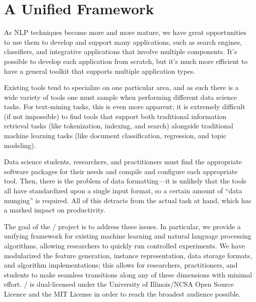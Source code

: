 \section{A Unified Framework}
\label{sec:framework}

As NLP techniques become more and more mature, we have great opportunities to
use them to develop and support many applications, such as search engines,
classifiers, and integrative applications that involve multiple components. It's
possible to develop each application from scratch, but it's much more efficient
to have a general toolkit that supports multiple application types.

Existing tools tend to specialize on one particular area, and as such there is a
wide variety of tools one must sample when performing different data science
tasks. For text-mining tasks, this is even more apparent; it is extremely
difficult (if not impossible) to find tools that support both traditional
information retrieval tasks (like tokenization, indexing, and search) alongside
traditional machine learning tasks (like document classification, regression,
and topic modeling).

Data science students, researchers, and practitioners must find the appropriate
software packages for their needs and compile and configure each appropriate
tool. Then, there is the problem of data formatting---it is unlikely that the
tools all have standardized upon a single input format, so a certain amount of
``data munging'' is required. All of this detracts from the actual task at hand,
which has a marked impact on productivity.

The goal of the \meta/ project is to address these issues. In particular, we
provide a unifying framework for existing machine learning and natural language
processing algorithms, allowing researchers to quickly run controlled
experiments. We have modularized the feature generation, instance
representation, data storage formats, and algorithm implementations; this allows
for researchers, practitioners, and students to make seamless transitions along
any of these dimensions with minimal effort. \meta/ is dual-licensed under the
University of Illinois/NCSA Open Source Licence and the MIT License in order to
reach the broadest audience possible.

